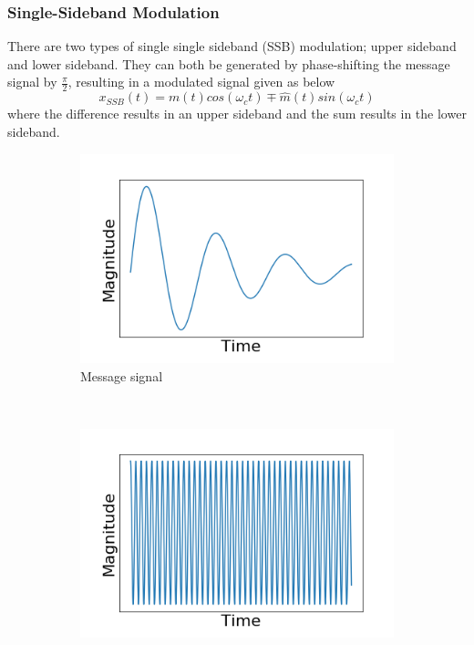 \documentclass[]{article}
\begin{document}
\subsubsection{Single-Sideband Modulation}
There are two types of single single sideband (SSB) modulation; upper sideband and lower sideband. They can both be generated by phase-shifting the message signal by $\frac{\pi}{2}$, resulting in a modulated signal given as below
\begin{equation} x_{SSB}(t) = m(t)cos(\omega_{c}t) \mp \hat{m}(t)sin(\omega_{c}t) \end{equation}
where the difference results in an upper sideband and the sum results in the lower sideband.
\begin{figure}[h!]
	\centering
	\begin{subfigure}[b]{0.3\textwidth}
		\includegraphics[width=\textwidth]{figs/amplitude_modulation/ssb/message_signal.png}
		\caption{Message signal}
		\label{fig:ssb_message_signal}
	\end{subfigure}
	~ %
	\begin{subfigure}[b]{0.3\textwidth}
		\includegraphics[width=\textwidth]{figs/amplitude_modulation/ssb/carrier_signal.png}

\end{subfigure}
\end{figure}
\end{document}
